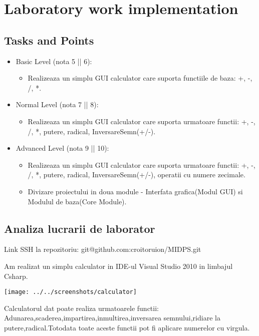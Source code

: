 \section{Laboratory work implementation}

\subsection{Tasks and Points}

\begin{itemize}
	\item Basic Level (nota 5 || 6):
	
	\begin{itemize}
		\item Realizeaza un simplu GUI calculator care suporta functiile de baza: +, -, /, *.
	\end{itemize}
	
	\item Normal Level (nota 7 || 8):
	
	\begin{itemize}
		\item Realizeaza un simplu GUI calculator care suporta urmatoare functii: +, -, /, *, putere, radical, InversareSemn(+/-).
	\end{itemize}
	\item Advanced Level (nota 9 || 10):
	
	\begin{itemize}
		\item Realizeaza un simplu GUI calculator care suporta urmatoare functii: +, -, /, *, putere, radical, InversareSemn(+/-), operatii cu numere zecimale.
	\end{itemize}
	\begin{itemize}
		\item Divizare proiectului in doua module - Interfata grafica(Modul GUI) si Modulul de baza(Core Module).
	\end{itemize}
\end{itemize}
\subsection{Analiza lucrarii de laborator}

Link SSH la repozitoriu: git@github.com:croitoruion/MIDPS.git


Am realizat un simplu calculator in IDE-ul Visual Studio 2010 in limbajul Csharp.

\begin{center}
	\texttt{[image: ../../screenshots/calculator]}
\end{center}
Calculatorul dat poate realiza urmatoarele functii: Adunarea,scaderea,impartirea,inmultirea,inversarea semnului,ridiare la putere,radical.Totodata toate aceste functii pot fi aplicare numerelor cu virgula.

